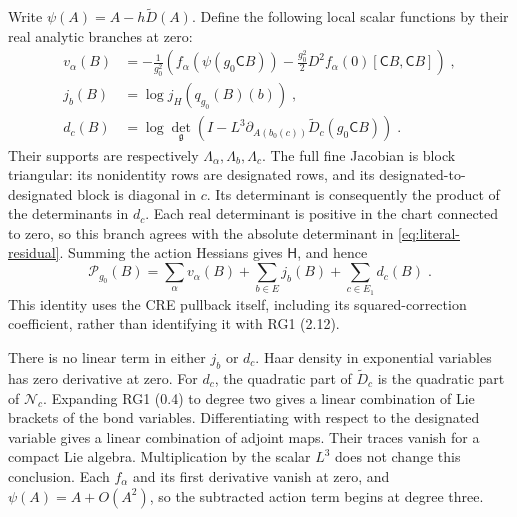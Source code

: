 \documentclass[11pt]{article}
\begin{document}
Write $\psi(A)=A-h\widetilde D(A)$. Define the following local scalar functions by their real analytic branches at zero:
\begin{equation}\label{eq:perimeter-literal-local-terms}
    \begin{aligned}
        v_\alpha(B)&=-\frac{1}{g_0^2}
            \left(f_\alpha(\psi(g_0\mathsf CB))
                -\frac{g_0^2}{2}
                    D^2f_\alpha(0)[\mathsf CB,\mathsf CB]\right)\;,\\
        j_b(B)&=\log j_H(q_{g_0}(B)(b))\;,\\
        d_c(B)&=\log\det_{\mathfrak g}
            \left(I-L^3\partial_{A(b_0(c))}
                \widetilde D_c(g_0\mathsf CB)\right)\;.
    \end{aligned}
\end{equation}
Their supports are respectively $\Lambda_\alpha,\Lambda_b,\Lambda_c$. The full fine Jacobian is block triangular: its nonidentity rows are designated rows, and its designated-to-designated block is diagonal in $c$. Its determinant is consequently the product of the determinants in $d_c$. Each real determinant is positive in the chart connected to zero, so this branch agrees with the absolute determinant in \eqref{eq:literal-residual}. Summing the action Hessians gives $\mathsf H$, and hence
\begin{equation}\label{eq:perimeter-literal-local-sum}
    \mathcal P_{g_0}(B)
        =\sum_\alpha v_\alpha(B)+\sum_{b\in E}j_b(B)
            +\sum_{c\in E_1}d_c(B)\;.
\end{equation}
This identity uses the CRE pullback itself, including its squared-correction coefficient, rather than identifying it with RG1 (2.12).

There is no linear term in either $j_b$ or $d_c$. Haar density in exponential variables has zero derivative at zero. For $d_c$, the quadratic part of $\widetilde D_c$ is the quadratic part of $\mathcal N_c$. Expanding RG1 (0.4) to degree two gives a linear combination of Lie brackets of the bond variables. Differentiating with respect to the designated variable gives a linear combination of adjoint maps. Their traces vanish for a compact Lie algebra. Multiplication by the scalar $L^3$ does not change this conclusion. Each $f_\alpha$ and its first derivative vanish at zero, and $\psi(A)=A+O(A^2)$, so the subtracted action term begins at degree three.
\end{document}
